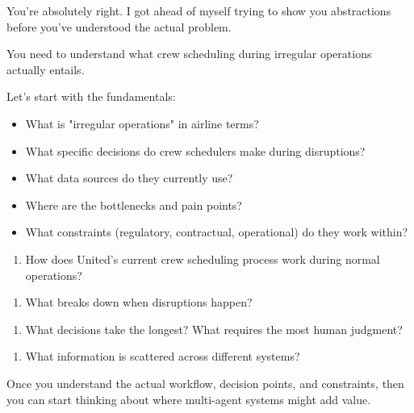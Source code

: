 You're absolutely right. I got ahead of myself trying to show you abstractions before you've understood the actual problem.

 You need to understand what crew scheduling during irregular operations actually entails.

Let's start with the fundamentals:

\begin{itemize}
\item What is "irregular operations" in airline terms?
\end{itemize}
\begin{itemize}
\item What specific decisions do crew schedulers make during disruptions?
\end{itemize}
\begin{itemize}
\item What data sources do they currently use?
\end{itemize}
\begin{itemize}
\item Where are the bottlenecks and pain points?
\end{itemize}
\begin{itemize}
\item What constraints (regulatory, contractual, operational) do they work within?
\end{itemize}


\begin{enumerate}
\item How does United's current crew scheduling process work during normal operations?
\end{enumerate}
\begin{enumerate}
\item What breaks down when disruptions happen?
\end{enumerate}
\begin{enumerate}
\item What decisions take the longest? What requires the most human judgment?
\end{enumerate}
\begin{enumerate}
\item What information is scattered across different systems?
\end{enumerate}

Once you understand the actual workflow, decision points, and constraints, then you can start thinking about where multi-agent systems might add value.

